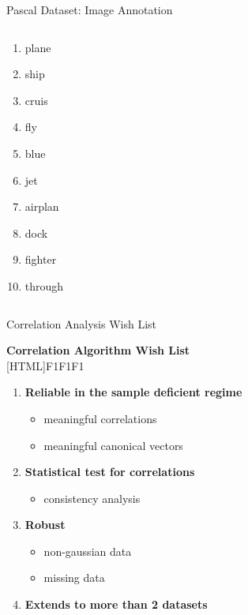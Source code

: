 \documentclass[8pt]{beamer}
\begin{document}
\begin{frame}{Pascal Dataset: Image Annotation}
\begin{columns}[T]
\begin{column}{0.5\textwidth}
\begin{minipage}[t]{0.4\textwidth}
      \begin{enumerate}
      \item plane
      \item ship
      \item cruis
      \item fly
      \item blue
      \item jet
      \item airplan
      \item dock
      \item fighter
      \item through
      \end{enumerate}
    \end{minipage}
  \end{column}
\end{columns}
\end{frame}


\begin{frame}{Correlation Analysis Wish List}
  \addtocounter{framenumber}{-1}

  \begin{center}
    \textbf{Correlation Algorithm Wish List}\\[1ex]
[HTML]{F1F1F1}{\parbox{0.8\textwidth}{%
    \begin{enumerate}
    \item \textcolor{texthigh}{\textbf{Reliable in the sample deficient regime} \checkmark}
      \begin{itemize}
      \item {\textcolor{texthigh}{meaningful correlations \checkmark}}
      \item \textcolor{texthigh}{meaningful canonical vectors \checkmark}
      \end{itemize}
    \item {\textcolor{texthigh}{\textbf{Statistical test for correlations} \checkmark}}
      \begin{itemize}
      \item {\textcolor{texthigh}{consistency analysis \checkmark}}
      \end{itemize}
    \item {\textcolor{texthigh}{\textbf{Robust} \checkmark}}
      \begin{itemize}
      \item {\textcolor{texthigh}{non-gaussian data \checkmark}}
      \item {\textcolor{texthigh}{missing data \checkmark}}
      \end{itemize}
    \item \textcolor{texthigh}{\textbf{Extends to more than 2 datasets} \checkmark}
    \end{enumerate}
}}
\end{center}

\end{frame}
\end{document}

